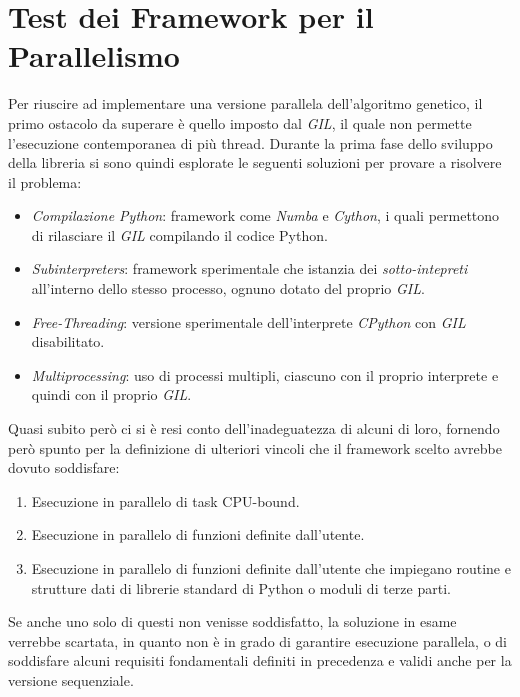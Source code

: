 \section{Test dei Framework per il Parallelismo}\label{sec: frameworks}

Per riuscire ad implementare una versione parallela dell'algoritmo genetico,
il primo ostacolo da superare è quello imposto dal \textit{GIL}, il quale non
permette l'esecuzione contemporanea di più thread. Durante la prima fase dello
sviluppo della libreria si sono quindi esplorate le seguenti soluzioni per
provare a risolvere il problema:
\begin{itemize}
	\item \textit{Compilazione Python}: framework come \textit{Numba} e
	      \textit{Cython}, i quali permettono di rilasciare il \textit{GIL}
	      compilando il codice Python.
	\item \textit{Subinterpreters}: framework sperimentale che istanzia dei
	      \textit{sotto-intepreti} all'interno dello stesso processo, ognuno
	      dotato del proprio \textit{GIL}.
	\item \textit{Free-Threading}: versione sperimentale dell'interprete
	      \textit{CPython} con \textit{GIL} disabilitato.
	\item \textit{Multiprocessing}: uso di processi multipli, ciascuno con il
	      proprio interprete e quindi con il proprio \textit{GIL}.
\end{itemize}
Quasi subito però ci si è resi conto dell'inadeguatezza di alcuni di loro,
fornendo però spunto per la definizione di ulteriori vincoli che il framework
scelto avrebbe dovuto soddisfare:
\begin{enumerate}
	\item Esecuzione in parallelo di task CPU-bound.
	\item Esecuzione in parallelo di funzioni definite dall'utente.
	\item Esecuzione in parallelo di funzioni definite dall'utente che
	      impiegano routine e strutture dati di librerie standard di Python o
	      moduli di terze parti.
\end{enumerate}
Se anche uno solo di questi non venisse soddisfatto, la soluzione in esame
verrebbe scartata, in quanto non è in grado di garantire esecuzione parallela,
o di soddisfare alcuni requisiti fondamentali definiti in precedenza e validi
anche per la versione sequenziale.

